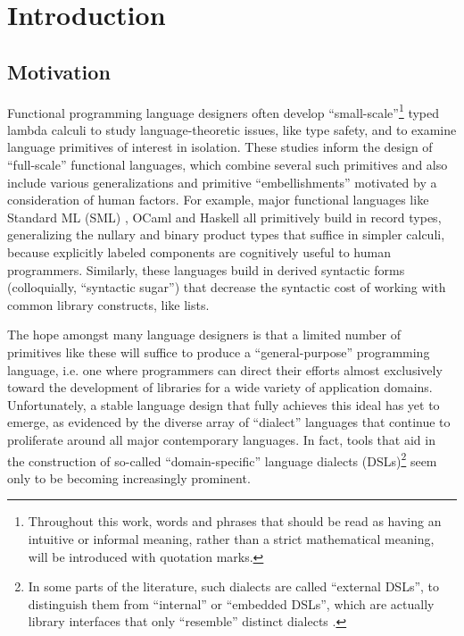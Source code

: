 \chapter{Introduction}\label{chap:intro}
\section{Motivation}\label{sec:intro-motivation}
Functional programming language designers often develop ``small-scale''\footnote{Throughout this work, words and phrases that should be read as having an intuitive or informal meaning, rather than a strict mathematical meaning, will be introduced with quotation marks.} typed lambda calculi to study language-theoretic issues, like type safety, and to examine language primitives of interest in isolation. These studies inform the design of ``full-scale'' functional languages, which combine several such primitives and also include various generalizations and primitive ``embellishments''  motivated by a consideration of human factors. 
For example, major functional languages like Standard ML (SML) \cite{mthm97-for-dart,harper1997programming}, OCaml \cite{ocaml-manual} and Haskell \cite{jones2003haskell} all primitively build in record types, generalizing the nullary and binary product types that suffice in simpler calculi, because explicitly labeled components are cognitively useful to human programmers. Similarly, these languages build in derived syntactic forms (colloquially, ``syntactic sugar'') that decrease the syntactic cost of working with common library constructs, like lists.

The hope amongst many language designers is that a limited number of primitives like these will suffice to produce a ``general-purpose'' programming language, i.e. one where programmers can direct their efforts almost exclusively toward the development of libraries for a wide variety of application domains. Unfortunately, a stable language design that fully achieves this ideal has yet to emerge, as evidenced by the diverse array of ``dialect'' languages that continue to proliferate around all major contemporary languages. 
In fact, tools that aid in the construction of so-called  ``domain-specific'' language dialects (DSLs)\footnote{In some parts of the literature, such dialects are called ``external DSLs'', to distinguish them from  ``internal'' or ``embedded DSLs'', which are actually  library interfaces that only ``resemble'' distinct dialects \cite{fowler2010domain}.} seem only to be becoming increasingly prominent. 

